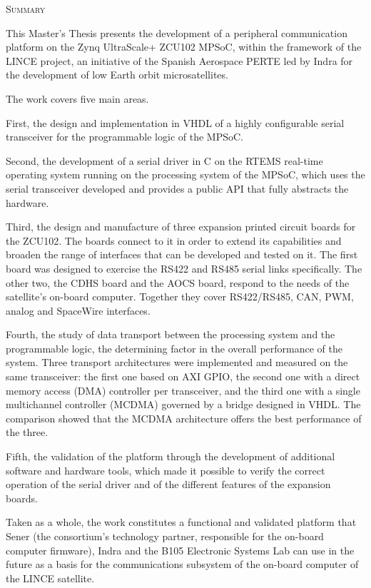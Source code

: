 \vspace{0.9cm}

\Large{\textsc{\textcolor{nar}{Summary}}} \par
\vspace{0.2cm}
\normalsize{%
This Master's Thesis presents the development of a peripheral communication platform on the Zynq
UltraScale+ ZCU102 MPSoC, within the framework of the LINCE project, an initiative of the Spanish
Aerospace PERTE led by Indra for the development of low Earth orbit microsatellites.

The work covers five main areas.

First, the design and implementation in VHDL of a highly configurable serial transceiver for the
programmable logic of the MPSoC.

Second, the development of a serial driver in C on the RTEMS real-time operating system running on
the processing system of the MPSoC, which uses the serial transceiver developed and provides a
public API that fully abstracts the hardware.

Third, the design and manufacture of three expansion printed circuit boards for the ZCU102. The
boards connect to it in order to extend its capabilities and broaden the range of interfaces that
can be developed and tested on it. The first board was designed to exercise the RS422 and RS485
serial links specifically. The other two, the CDHS board and the AOCS board, respond to the needs
of the satellite's on-board computer. Together they cover RS422/RS485, CAN, PWM, analog and
SpaceWire interfaces.

Fourth, the study of data transport between the processing system and the programmable logic, the
determining factor in the overall performance of the system. Three transport architectures were
implemented and measured on the same transceiver: the first one based on AXI GPIO, the second one
with a direct memory access (DMA) controller per transceiver, and the third one with a single
multichannel controller (MCDMA) governed by a bridge designed in VHDL. The comparison showed that
the MCDMA architecture offers the best performance of the three.

Fifth, the validation of the platform through the development of additional software and hardware
tools, which made it possible to verify the correct operation of the serial driver and of the
different features of the expansion boards.

Taken as a whole, the work constitutes a functional and validated platform that Sener (the
consortium's technology partner, responsible for the on-board computer firmware), Indra and the
B105 Electronic Systems Lab can use in the future as a basis for the communications subsystem of the on-board
computer of the LINCE satellite.
}
\vspace{0.9cm}

